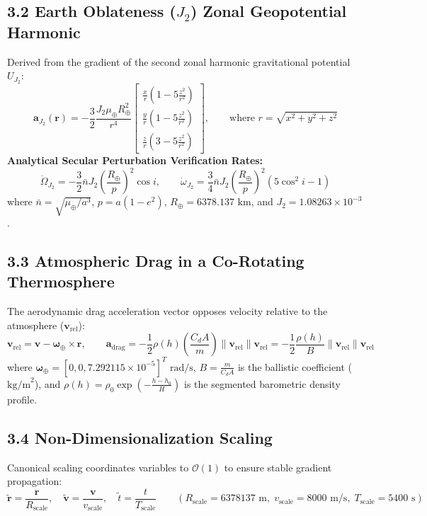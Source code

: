 \documentclass[11pt,a4paper]{article}
\begin{document}
\subsection*{3.2 Earth Oblateness ($J_2$) Zonal Geopotential Harmonic}
Derived from the gradient of the second zonal harmonic gravitational potential $U_{J_2}$:
\begin{equation}
    \mathbf{a}_{J_2}(\mathbf{r}) = -\frac{3}{2}\frac{J_2 \mu_\oplus R_\oplus^2}{r^4} 
    \begin{bmatrix} 
    \frac{x}{r}\left(1 - 5\frac{z^2}{r^2}\right) \\[4pt]
    \frac{y}{r}\left(1 - 5\frac{z^2}{r^2}\right) \\[4pt]
    \frac{z}{r}\left(3 - 5\frac{z^2}{r^2}\right)
    \end{bmatrix}, \qquad \text{where } r = \sqrt{x^2+y^2+z^2}
\end{equation}
\textbf{Analytical Secular Perturbation Verification Rates:}
\begin{equation}
    \dot{\Omega}_{J_2} = -\frac{3}{2} \bar{n} J_2 \left(\frac{R_\oplus}{p}\right)^2 \cos i, \qquad \dot{\omega}_{J_2} = \frac{3}{4} \bar{n} J_2 \left(\frac{R_\oplus}{p}\right)^2 (5\cos^2 i - 1)
\end{equation}
where $\bar{n} = \sqrt{\mu_\oplus/a^3}$, $p = a(1-e^2)$, $R_\oplus = 6378.137\text{ km}$, and $J_2 = 1.08263 \times 10^{-3}$.

\subsection*{3.3 Atmospheric Drag in a Co-Rotating Thermosphere}
The aerodynamic drag acceleration vector opposes velocity relative to the atmosphere ($\mathbf{v}_{\text{rel}}$):
\begin{equation}
    \mathbf{v}_{\text{rel}} = \mathbf{v} - \boldsymbol{\omega}_\oplus \times \mathbf{r}, \qquad \mathbf{a}_{\text{drag}} = -\frac{1}{2} \rho(h) \left(\frac{C_d A}{m}\right) \|\mathbf{v}_{\text{rel}}\| \mathbf{v}_{\text{rel}} = -\frac{1}{2} \frac{\rho(h)}{B} \|\mathbf{v}_{\text{rel}}\| \mathbf{v}_{\text{rel}}
\end{equation}
where $\boldsymbol{\omega}_\oplus = [0, 0, 7.292115 \times 10^{-5}]^T\text{ rad/s}$, $B = \frac{m}{C_d A}$ is the ballistic coefficient ($\text{kg/m}^2$), and $\rho(h) = \rho_0 \exp\left(-\frac{h - h_0}{H}\right)$ is the segmented barometric density profile.

\subsection*{3.4 Non-Dimensionalization Scaling}
Canonical scaling coordinates variables to $\mathcal{O}(1)$ to ensure stable gradient propagation:
\begin{equation}
    \tilde{\mathbf{r}} = \frac{\mathbf{r}}{R_{\text{scale}}}, \quad \tilde{\mathbf{v}} = \frac{\mathbf{v}}{v_{\text{scale}}}, \quad \tilde{t} = \frac{t}{T_{\text{scale}}} \qquad (R_{\text{scale}} = 6378137\text{ m},\; v_{\text{scale}} = 8000\text{ m/s},\; T_{\text{scale}} = 5400\text{ s})
\end{equation}
\end{document}
